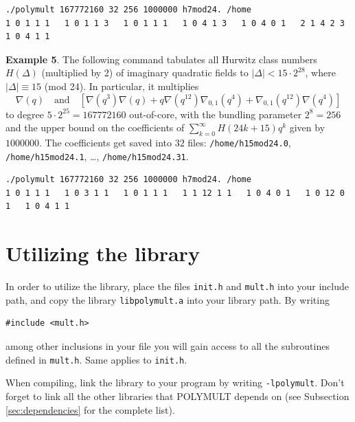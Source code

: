 \documentclass[a4paper,10pt]{article}
\newcommand{\code}{\lstinline}
\begin{document}
\begin{verbatim}
./polymult 167772160 32 256 1000000 h7mod24. /home
1 0 1 1 1   1 0 1 1 3   1 0 1 1 1   1 0 4 1 3   1 0 4 0 1   2 1 4 2 3   1 0 4 1 1
\end{verbatim}


\textbf{Example 5}. The following command tabulates all Hurwitz class numbers $H(\Delta)$ (multiplied by 2) of imaginary quadratic fields to $|\Delta| < 15 \cdot 2^{28}$, where $|\Delta| \equiv 15$ (mod 24). In particular, it multiplies
%
$$
\nabla(q) \quad \text{and} \quad \left[\nabla(q^3)\nabla(q) + q\nabla(q^{12})\nabla_{0, 1}(q^4) + \nabla_{0, 1}(q^{12})\nabla(q^4)\right]
$$
%
to degree $5 \cdot 2^{25} = 167772160$ out-of-core, with the bundling parameter $2^8=256$ and the upper bound on the coefficients of $\sum_{k = 0}^{\infty}H(24k + 15)q^k$ given by $1000000$. The coefficients get saved into $32$ files: \code{/home/h15mod24.0}, \code{/home/h15mod24.1}, \ldots, \code{/home/h15mod24.31}.

\begin{verbatim}
./polymult 167772160 32 256 1000000 h7mod24. /home
1 0 1 1 1   1 0 3 1 1   1 0 1 1 1   1 1 12 1 1   1 0 4 0 1   1 0 12 0 1   1 0 4 1 1
\end{verbatim}









\section{Utilizing the library} \label{sec:polymult_lib}

In order to utilize the library, place the files \code{init.h} and \code{mult.h} into your include path, and copy the library \code{libpolymult.a} into your library path. By writing

\begin{lstlisting}
#include <mult.h>
\end{lstlisting}

among other inclusions in your file you will gain access to all the subroutines defined in \code{mult.h}. Same applies to \code{init.h}.

When compiling, link the library to your program by writing \code{-lpolymult}. Don't forget to link all the other libraries that POLYMULT depends on (see Subsection \ref{sec:dependencies} for the complete list).
\end{document}
